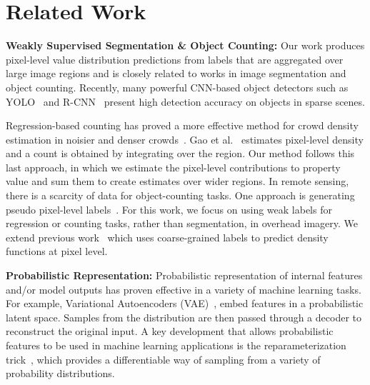 \documentclass[10pt,twocolumn,a4paper]{article}
\begin{document}


\section{Related Work}

\textbf{Weakly Supervised Segmentation \& Object Counting:} Our work produces pixel-level value distribution predictions from labels that are aggregated over large image regions and is closely related to works in image segmentation and object counting. Recently, many powerful CNN-based object detectors such as YOLO~\cite{yolo} and R-CNN~\cite{Girshick2014RichFH} present high detection accuracy on objects in sparse scenes. 

Regression-based counting has proved a more effective method for crowd density estimation in noisier and denser crowds~\cite{gao2020cnnbased}. Gao et al.~\cite{gao2020cnnbased} estimates pixel-level density and a count is obtained by integrating over the region.  Our method follows this last approach, in which we estimate the pixel-level contributions to property value and sum them to create estimates over wider regions.
%
In remote sensing, there is a scarcity of data for object-counting tasks. One approach is generating pseudo pixel-level labels~\cite{Gao2020remotesensing}.
%
For this work, we focus on using weak labels for regression or counting tasks, rather than segmentation, in overhead imagery. 
%
We extend previous work~\cite{jacobs2018weakly} which uses coarse-grained labels to predict density functions at pixel level. 

\textbf{Probabilistic Representation:}
  Probabilistic representation of internal features and/or model outputs has proven effective in a variety of machine learning tasks. For example, Variational Autoencoders (VAE)~\cite{Kingma2014AutoEncodingVB}, embed features in a probabilistic latent space. Samples from the distribution are then passed through a decoder to reconstruct the original input. A key development that allows probabilistic features to be used in machine learning applications is the reparameterization trick~\cite{Kingma2014AutoEncodingVB}, which provides a differentiable way of sampling from a variety of probability distributions.
 
\end{document}
